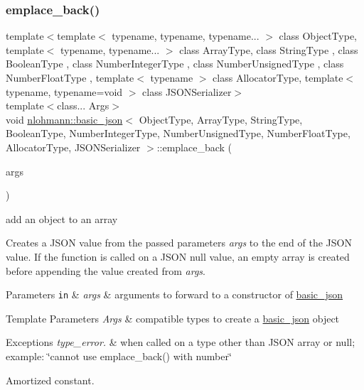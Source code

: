 \subsubsection{\texorpdfstring{emplace\+\_\+back()}{emplace\_back()}}
{\footnotesize\ttfamily template$<$template$<$ typename, typename, typename... $>$ class Object\+Type, template$<$ typename, typename... $>$ class Array\+Type, class String\+Type , class Boolean\+Type , class Number\+Integer\+Type , class Number\+Unsigned\+Type , class Number\+Float\+Type , template$<$ typename $>$ class Allocator\+Type, template$<$ typename, typename=void $>$ class J\+S\+O\+N\+Serializer$>$ \\
template$<$class... Args$>$ \\
void \hyperlink{classnlohmann_1_1basic__json}{nlohmann\+::basic\+\_\+json}$<$ Object\+Type, Array\+Type, String\+Type, Boolean\+Type, Number\+Integer\+Type, Number\+Unsigned\+Type, Number\+Float\+Type, Allocator\+Type, J\+S\+O\+N\+Serializer $>$\+::emplace\+\_\+back (\begin{DoxyParamCaption}\item[{Args \&\&...}]{args }\end{DoxyParamCaption})\hspace{0.3cm}{\ttfamily [inline]}}



add an object to an array 

Creates a J\+S\+ON value from the passed parameters {\itshape args} to the end of the J\+S\+ON value. If the function is called on a J\+S\+ON null value, an empty array is created before appending the value created from {\itshape args}.


\begin{DoxyParams}[1]{Parameters}
\mbox{\tt in}  & {\em args} & arguments to forward to a constructor of \hyperlink{classnlohmann_1_1basic__json}{basic\+\_\+json} \\
\hline
\end{DoxyParams}

\begin{DoxyTemplParams}{Template Parameters}
{\em Args} & compatible types to create a \hyperlink{classnlohmann_1_1basic__json}{basic\+\_\+json} object\\
\hline
\end{DoxyTemplParams}

\begin{DoxyExceptions}{Exceptions}
{\em type\+\_\+error.} & when called on a type other than J\+S\+ON array or null; example\+: {\ttfamily \char`\"{}cannot use emplace\+\_\+back() with number\char`\"{}}\\
\hline
\end{DoxyExceptions}
Amortized constant.

